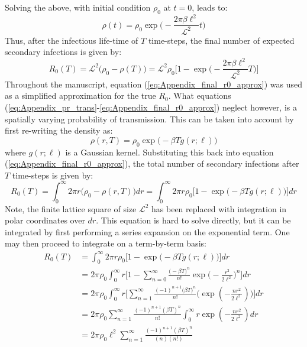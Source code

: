 Solving the above, with initial condition $\rho_0$ at $t=0$, leads to:
\begin{equation}
    \rho(t) = \rho_0 \exp\Big(-\frac{2\pi\beta\ell^2}{\mathcal{L}^2} t \Big)
\end{equation}
Thus, after the infectious life-time of $T$ time-steps, the final number of expected secondary infections is given by:
\begin{equation}
\label{eq:Appendix_final_r0_approx}
    R_0(T) =  \mathcal{L}^2\big(\rho_0 - \rho(T)\big) = \mathcal{L}^2\rho_0\Big[1 - \exp\big(-\frac{2\pi\beta\ell^2}{\mathcal{L}^2} T \big) \Big]
\end{equation}
Throughout the manuscript, equation (\ref{eq:Appendix_final_r0_approx}) was used as a simplified approximation for the true $R_0$. What equations (\ref{eq:Appendix_pr_trans}-\ref{eq:Appendix_final_r0_approx}) neglect however, is a spatially varying probability of transmission. This can be taken into account by first re-writing the density as:
\begin{equation}
    \rho(r, T) = \rho_0\exp \big( -\beta T g(r; \ell) \big)
\end{equation}
where $g(r;\ell)$ is a Gaussian kernel. Substituting this back into equation (\ref{eq:Appendix_final_r0_approx}), the total number of secondary infections after $T$ time-steps is given by:
\begin{equation}
   R_0(T) = \int ^\infty _0 2\pi r \big (\rho_0 - \rho(r, T)\big)dr =  \int ^\infty _0 2\pi r \rho_0 \Big[1 - \exp\big(-\beta T g(r;\ell)\big) \Big]dr
\end{equation}
Note, the finite lattice square of size $\mathcal{L}^2$ has been replaced with integration in polar coordinates over $dr$. This equation is hard to solve directly, but it can be integrated by first performing a series expansion on the exponential term. One may then proceed to integrate on a term-by-term basis:
\begin{equation} \label{eq:Appendix_final_expression}
\begin{split}
R_0(T) & = \int^\infty_0 2\pi r \rho_0 \Big[1 - \exp \big( -\beta T g(r;\ell)\big)\Big]dr \\
& = 2\pi\rho_0 \int^\infty _0 r \Big[1 - \sum^\infty_{n=0} \frac{\big(-\beta T)^n}{n!} \exp\big(-\frac{r^2}{2\ell^2}\big)^n  \Big] dr \\
& = 2\pi\rho_0 \int^\infty _0 r \Big[\sum^\infty_{n=1} \frac{(-1)^{n+1}\big(\beta T)^n}{n!} \Big(\exp(-\frac{n r^2}{2\ell^2} ) \Big)  \Big] dr \\
& = 2\pi\rho_0 \sum^{\infty}_{n=1} \frac{(-1)^{n+1} (\beta T)^n}{n!} \int^\infty _0 r \exp(-\frac{n r^2}{2\ell^2})dr  \\
& = 2\pi\rho_0 \ell^2 \sum^{\infty}_{n=1} \frac{(-1)^{n+1}(\beta T)^n}{(n)(n!) }
\end{split}
\end{equation}

